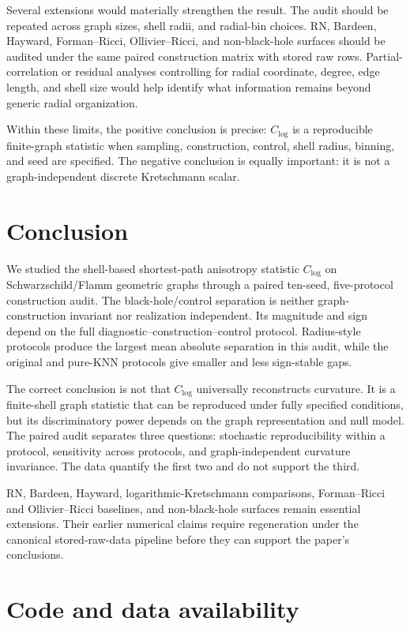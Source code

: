 \documentclass[11pt,a4paper]{article}
\begin{document}
Several extensions would materially strengthen the result. The audit should be repeated across graph sizes, shell radii, and radial-bin choices. RN, Bardeen, Hayward, Forman--Ricci, Ollivier--Ricci, and non-black-hole surfaces should be audited under the same paired construction matrix with stored raw rows. Partial-correlation or residual analyses controlling for radial coordinate, degree, edge length, and shell size would help identify what information remains beyond generic radial organization.

Within these limits, the positive conclusion is precise: $C_{\log}$ is a reproducible finite-graph statistic when sampling, construction, control, shell radius, binning, and seed are specified. The negative conclusion is equally important: it is not a graph-independent discrete Kretschmann scalar.

\section{Conclusion}
\label{sec:conclusion}

We studied the shell-based shortest-path anisotropy statistic $C_{\log}$ on Schwarzschild/Flamm geometric graphs through a paired ten-seed, five-protocol construction audit. The black-hole/control separation is neither graph-construction invariant nor realization independent. Its magnitude and sign depend on the full diagnostic--construction--control protocol. Radius-style protocols produce the largest mean absolute separation in this audit, while the original and pure-KNN protocols give smaller and less sign-stable gaps.

The correct conclusion is not that $C_{\log}$ universally reconstructs curvature. It is a finite-shell graph statistic that can be reproduced under fully specified conditions, but its discriminatory power depends on the graph representation and null model. The paired audit separates three questions: stochastic reproducibility within a protocol, sensitivity across protocols, and graph-independent curvature invariance. The data quantify the first two and do not support the third.

RN, Bardeen, Hayward, logarithmic-Kretschmann comparisons, Forman--Ricci and Ollivier--Ricci baselines, and non-black-hole surfaces remain essential extensions. Their earlier numerical claims require regeneration under the canonical stored-raw-data pipeline before they can support the paper's conclusions.

\section*{Code and data availability}
\end{document}
